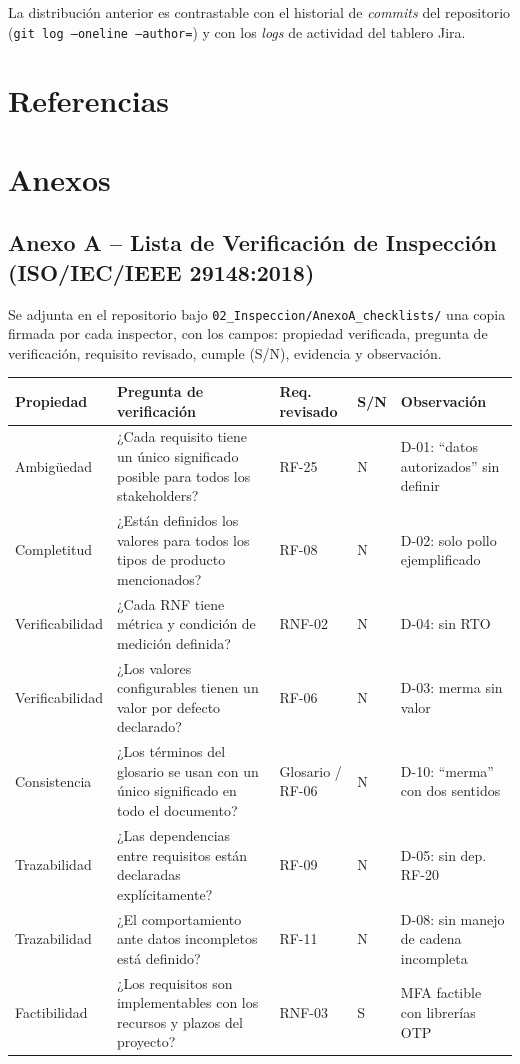 \documentclass[11pt,a4paper]{article}
\begin{document}
La distribución anterior es contrastable con el historial de \textit{commits} del repositorio
(\texttt{git log --oneline --author=}) y con los \textit{logs} de actividad del tablero Jira.

\section{Referencias}



\section{Anexos}
\subsection*{Anexo A -- Lista de Verificación de Inspección (ISO/IEC/IEEE 29148:2018)}
Se adjunta en el repositorio bajo \texttt{02\_Inspeccion/AnexoA\_checklists/} una copia firmada
por cada inspector, con los campos: propiedad verificada, pregunta de verificación, requisito
revisado, cumple (S/N), evidencia y observación.

\begin{longtable}{|p{2.2cm}|p{4.6cm}|p{1.8cm}|p{0.6cm}|p{4.3cm}|}
\hline
\textbf{Propiedad} & \textbf{Pregunta de verificación} & \textbf{Req. revisado} & \textbf{S/N} & \textbf{Observación} \\
\hline
Ambigüedad & ¿Cada requisito tiene un único significado posible para todos los stakeholders? & RF-25 & N & D-01: “datos autorizados” sin definir \\
\hline
Completitud & ¿Están definidos los valores para todos los tipos de producto mencionados? & RF-08 & N & D-02: solo pollo ejemplificado \\
\hline
Verificabilidad & ¿Cada RNF tiene métrica y condición de medición definida? & RNF-02 & N & D-04: sin RTO \\
\hline
Verificabilidad & ¿Los valores configurables tienen un valor por defecto declarado? & RF-06 & N & D-03: merma sin valor \\
\hline
Consistencia & ¿Los términos del glosario se usan con un único significado en todo el documento? & Glosario / RF-06 & N & D-10: “merma” con dos sentidos \\
\hline
Trazabilidad & ¿Las dependencias entre requisitos están declaradas explícitamente? & RF-09 & N & D-05: sin dep. RF-20 \\
\hline
Trazabilidad & ¿El comportamiento ante datos incompletos está definido? & RF-11 & N & D-08: sin manejo de cadena incompleta \\
\hline
Factibilidad & ¿Los requisitos son implementables con los recursos y plazos del proyecto? & RNF-03 & S & MFA factible con librerías OTP \\
\hline
\end{longtable}
\end{document}

